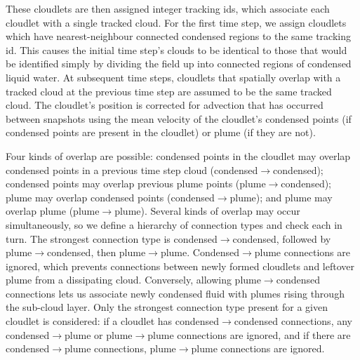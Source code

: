 \documentclass[acp]{copernicus}
\begin{document}
These cloudlets are then assigned integer tracking ids, which associate each 
cloudlet with a single tracked cloud.  For the first time step, we assign 
cloudlets which have nearest-neighbour connected condensed regions to the same
tracking id.  This causes the initial time step's clouds to be identical to 
those that would be identified simply by dividing the field up into connected 
regions of condensed liquid water.  At subsequent time steps, cloudlets that
spatially overlap with a tracked cloud at the previous time step are assumed to 
be the same tracked cloud.  The cloudlet's position is corrected for advection 
that has occurred between snapshots using the mean velocity of the cloudlet's
condensed points (if condensed points are present in the cloudlet) or plume (if 
they are not).

Four kinds of overlap are possible: condensed points in the cloudlet may 
overlap condensed points in a previous time step cloud 
(condensed$\rightarrow$condensed); condensed points may overlap previous 
plume points (plume$\rightarrow$condensed); plume may overlap condensed 
points (condensed$\rightarrow$plume); and plume may overlap plume 
(plume$\rightarrow$plume).  Several kinds of overlap may occur 
simultaneously, so we define a hierarchy of connection types and check each in 
turn.  The strongest connection type is condensed$\rightarrow$condensed, 
followed by plume$\rightarrow$condensed, then plume$\rightarrow$plume.  
Condensed$\rightarrow$plume connections are ignored, which prevents 
connections between newly formed cloudlets and leftover plume from a 
dissipating cloud.  Conversely, allowing plume$\rightarrow$condensed 
connections lets us associate newly condensed fluid with plumes rising through 
the sub-cloud layer.  Only the strongest connection type present for a given 
cloudlet is considered: if a cloudlet has condensed$\rightarrow$condensed 
connections, any condensed$\rightarrow$plume or plume$\rightarrow$plume 
connections are ignored, and if there are condensed$\rightarrow$plume 
connections, plume$\rightarrow$plume connections are ignored.  
\end{document}

